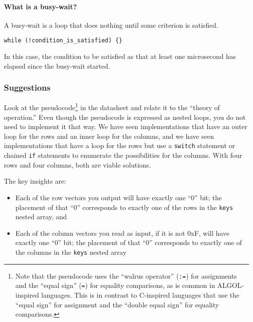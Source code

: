 \paragraph{What is a busy-wait?}
A busy-wait is a loop that does nothing until some criterion is satisfied.
\begin{lstlisting}[numbers=none, basicstyle=\ttfamily\small]
    while (!condition_is_satisfied) {}
\end{lstlisting}
In this case, the condition to be satisfied as that at least one microsecond has elapsed since the busy-wait started.
\begin{description}
\end{description}

\subsubsection*{Suggestions}
Look at the pseudocode\footnote{
    Note that the pseudocode uses the ``walrus operator'' (\texttt{:=}) for assignments and the ``equal sign'' (\texttt{=}) for equality comparisons, as is common in ALGOL-inspired languages.
    This is in contrast to C-inspired languages that use the ``equal sign'' for assignment and the ``double equal sign'' for equality comparisons.
} in the datasheet and relate it to the ``theory of operation.''
Even though the pseudocode is expressed as nested loops, you do not need to implement it that way.
We have seen implementations that have an outer loop for the rows and an inner loop for the columns,
and we have seen implementations that have a loop for the rows but use a \lstinline{switch} statement or chained \lstinline{if} statements to enumerate the possibilities for the columns.
With four rows and four columns, both are viable solutions.

The key insights are:
\begin{itemize}
    \item Each of the row vectors you output will have exactly one ``0'' bit;
        the placement of that ``0'' corresponds to exactly one of the rows in the \lstinline{keys} nested array, and
    \item Each of the column vectors you read as input, if it is not 0xF, will have exactly one ``0'' bit;
        the placement of that ``0'' corresponds to exactly one of the columns in the \lstinline{keys} nested array
\end{itemize}

